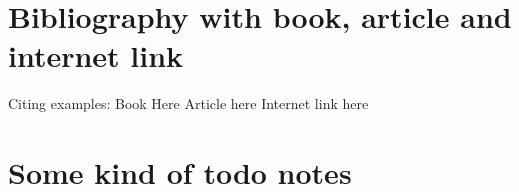 \documentclass[a4paper]{report}
\begin{document}
\chapter{Bibliography with book, article and internet link}
Citing examples:
Book Here\cite{dirac} 
Article here\cite{einstein}  
Internet link here\cite{orangutanwiki}  

\chapter{Some kind of todo notes}
\printbibliography
\end{document}
